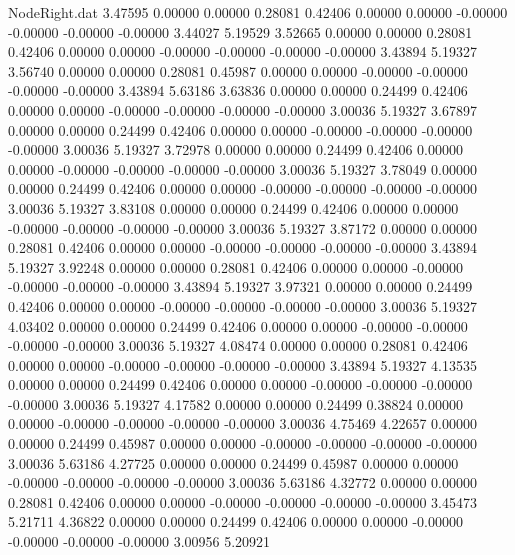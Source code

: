 \begin{filecontents}{NodeRight.dat}
   3.47595    0.00000    0.00000     0.28081    0.42406    0.00000    0.00000   -0.00000   -0.00000   -0.00000   -0.00000    3.44027    5.19529
   3.52665    0.00000    0.00000     0.28081    0.42406    0.00000    0.00000   -0.00000   -0.00000   -0.00000   -0.00000    3.43894    5.19327
   3.56740    0.00000    0.00000     0.28081    0.45987    0.00000    0.00000   -0.00000   -0.00000   -0.00000   -0.00000    3.43894    5.63186
   3.63836    0.00000    0.00000     0.24499    0.42406    0.00000    0.00000   -0.00000   -0.00000   -0.00000   -0.00000    3.00036    5.19327
   3.67897    0.00000    0.00000     0.24499    0.42406    0.00000    0.00000   -0.00000   -0.00000   -0.00000   -0.00000    3.00036    5.19327
   3.72978    0.00000    0.00000     0.24499    0.42406    0.00000    0.00000   -0.00000   -0.00000   -0.00000   -0.00000    3.00036    5.19327
   3.78049    0.00000    0.00000     0.24499    0.42406    0.00000    0.00000   -0.00000   -0.00000   -0.00000   -0.00000    3.00036    5.19327
   3.83108    0.00000    0.00000     0.24499    0.42406    0.00000    0.00000   -0.00000   -0.00000   -0.00000   -0.00000    3.00036    5.19327
   3.87172    0.00000    0.00000     0.28081    0.42406    0.00000    0.00000   -0.00000   -0.00000   -0.00000   -0.00000    3.43894    5.19327
   3.92248    0.00000    0.00000     0.28081    0.42406    0.00000    0.00000   -0.00000   -0.00000   -0.00000   -0.00000    3.43894    5.19327
   3.97321    0.00000    0.00000     0.24499    0.42406    0.00000    0.00000   -0.00000   -0.00000   -0.00000   -0.00000    3.00036    5.19327
   4.03402    0.00000    0.00000     0.24499    0.42406    0.00000    0.00000   -0.00000   -0.00000   -0.00000   -0.00000    3.00036    5.19327
   4.08474    0.00000    0.00000     0.28081    0.42406    0.00000    0.00000   -0.00000   -0.00000   -0.00000   -0.00000    3.43894    5.19327
   4.13535    0.00000    0.00000     0.24499    0.42406    0.00000    0.00000   -0.00000   -0.00000   -0.00000   -0.00000    3.00036    5.19327
   4.17582    0.00000    0.00000     0.24499    0.38824    0.00000    0.00000   -0.00000   -0.00000   -0.00000   -0.00000    3.00036    4.75469
   4.22657    0.00000    0.00000     0.24499    0.45987    0.00000    0.00000   -0.00000   -0.00000   -0.00000   -0.00000    3.00036    5.63186
   4.27725    0.00000    0.00000     0.24499    0.45987    0.00000    0.00000   -0.00000   -0.00000   -0.00000   -0.00000    3.00036    5.63186
   4.32772    0.00000    0.00000     0.28081    0.42406    0.00000    0.00000   -0.00000   -0.00000   -0.00000   -0.00000    3.45473    5.21711
   4.36822    0.00000    0.00000     0.24499    0.42406    0.00000    0.00000   -0.00000   -0.00000   -0.00000   -0.00000    3.00956    5.20921

\end{filecontents}
